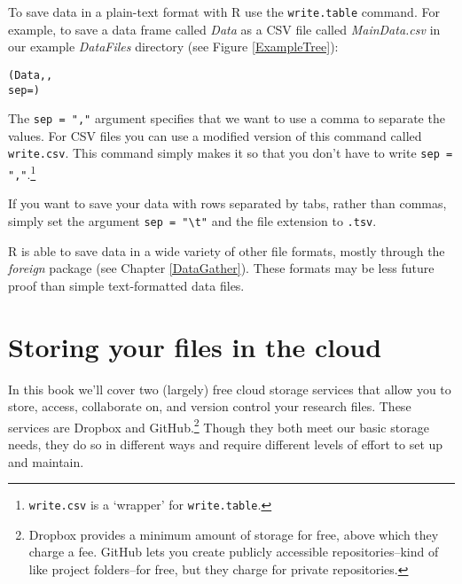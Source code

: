 To save data in a plain-text format with R use the \texttt{write.table} command. For example, to save a data frame called {\emph{Data}} as a CSV file called {\emph{MainData.csv}} in our example {\emph{DataFiles}} directory (see Figure \ref{ExampleTree}):

\begin{knitrout}
\color{fgcolor}\begin{kframe}
\begin{alltt}
(Data, ,
                 sep = )
\end{alltt}
\end{kframe}
\end{knitrout}


\noindent The \texttt{sep = ","} argument specifies that we want to use a comma to separate the values. For CSV files you can use a modified version of this command called \texttt{write.csv}. This command simply makes it so that you don't have to write \texttt{sep = ","}.\footnote{\texttt{write.csv} is a `wrapper' for \verb|write.table|.} 

If you want to save your data with rows separated by tabs, rather than commas, simply set the argument \verb|sep = "\t"| and the file extension to \texttt{.tsv}.\label{TSVEscape}

R is able to save data in a wide variety of other file formats, mostly through the {\emph{foreign}} package (see Chapter \ref{DataGather}). These formats may be less future proof than simple text-formatted data files.

\section{Storing your files in the cloud}

In this book we'll cover two (largely) free cloud storage services that allow you to store, access, collaborate on, and version control your research files. These services are Dropbox and GitHub.\footnote{Dropbox provides a minimum amount of storage for free, above which they charge a fee. GitHub lets you create publicly accessible repositories--kind of like project folders--for free, but they charge for private repositories.} Though they both meet our basic storage needs, they do so in different ways and require different levels of effort to set up and maintain.

